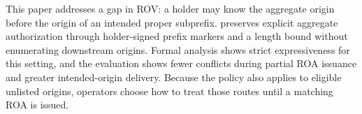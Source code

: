 \label{sec:conclusion}

This paper addresses a gap in ROV: a holder may know the aggregate origin before the origin of an intended proper subprefix. \ssrov{} preserves explicit aggregate authorization through holder-signed prefix markers and a length bound without enumerating downstream origins. Formal analysis shows strict expressiveness for this setting, and the evaluation shows fewer conflicts during partial ROA issuance and greater intended-origin delivery. Because the policy also applies to eligible unlisted origins, operators choose how to treat those routes until a matching ROA is issued.
